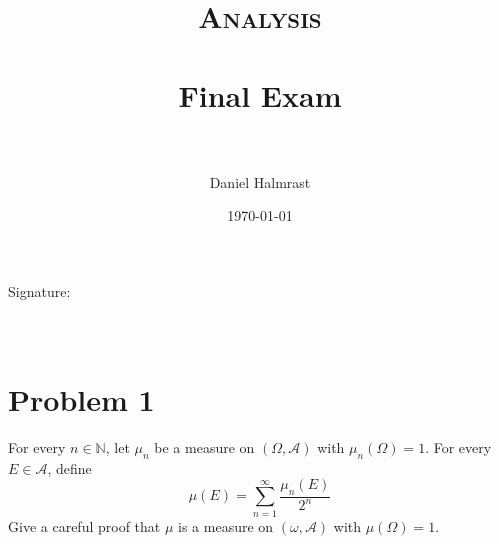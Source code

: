 \documentclass[fontsize=11pt]{scrartcl} %
\title{	
\normalfont \normalsize 
\textsc{Analysis} \\ [25pt] %
\horrule{0.5pt} \\[0.4cm] %
\huge Final Exam \\ %
\horrule{2pt} \\[0.5cm] %
}
\author{Daniel Halmrast} %
\date{\normalsize\today} %
\numberwithin{equation}{section} %
\numberwithin{figure}{section} %
\numberwithin{table}{section} %
\newcommand{\N}{\mathbb{N}}
\begin{document}
\maketitle %

Signature:
\\
\\
\\

\section*{Problem 1}
For every $n\in\N$, let $\mu_n$ be a measure on $(\Omega,\mathscr{A})$ with
$\mu_n(\Omega)=1$. For every $E\in\mathscr{A}$, define
\[
    \mu(E) = \sum_{n=1}^{\infty}\frac{\mu_n(E)}{2^n}
\]
Give a careful proof that $\mu$ is a measure on $(\omega,\mathscr{A})$ with
$\mu(\Omega)=1$.
\\
\end{document}
